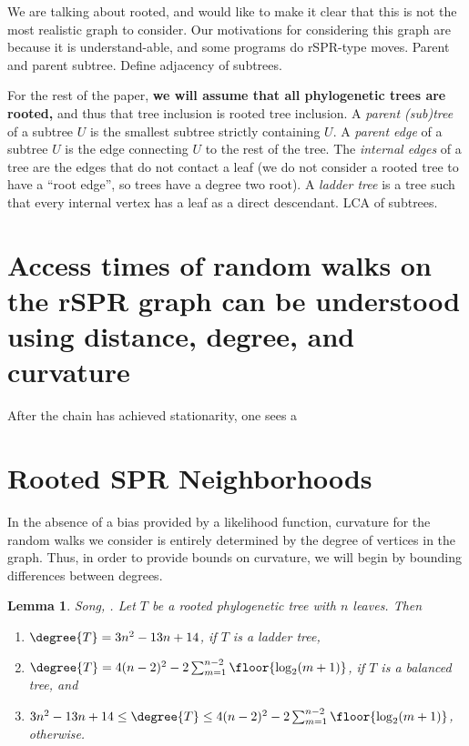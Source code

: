 \documentclass{amsart}
\newtheorem{lemma}[theorem]{Lemma}
\begin{document}
We are talking about rooted, and would like to make it clear that this is not the most realistic graph to consider.
Our motivations for considering this graph are because it is understand-able, and some programs do rSPR-type moves.
Parent and parent subtree.
Define adjacency of subtrees.

For the rest of the paper, \textbf{we will assume that all phylogenetic trees are rooted,} and thus that tree inclusion is rooted tree inclusion.
A \emph{parent (sub)tree} of a subtree $U$ is the smallest subtree strictly containing $U$.
A \emph{parent edge} of a subtree $U$ is the edge connecting $U$ to the rest of the tree.
The \emph{internal edges} of a tree are the edges that do not contact a leaf (we do not consider a rooted tree to have a ``root edge'', so trees have a degree two root).
A \emph{ladder tree} is a tree such that every internal vertex has a leaf as a direct descendant.
LCA of subtrees.

\section{Access times of random walks on the rSPR graph can be understood using distance, degree, and curvature}

After the chain has achieved stationarity, one sees a


\section{Rooted SPR Neighborhoods}

In the absence of a bias provided by a likelihood function, curvature for the random walks we consider is entirely determined by the degree of vertices in the graph.
Thus, in order to provide bounds on curvature, we will begin by bounding differences between degrees.

\begin{lemma}{Song, \cite{Song2003-gf}.}
	\label{lem:degree_extremes}
	Let $T$ be a rooted phylogenetic tree with $n$ leaves. Then
	\begin{enumerate}
		\item $\degree{T} = 3n^2 - 13n + 14$, if $T$ is a ladder tree,
		\item $\degree{T} = 4(n-2)^2 - 2 \sum_{m=1}^{n-2} \floor{\log_2(m+1)}$, if $T$ is a balanced tree, and
		\item  $3n^2 - 13n + 14 \le \degree{T} \le 4(n-2)^2 - 2 \sum_{m=1}^{n-2} \floor{\log_2(m+1)}$, otherwise.
	\end{enumerate}
\end{lemma}
\end{document}

